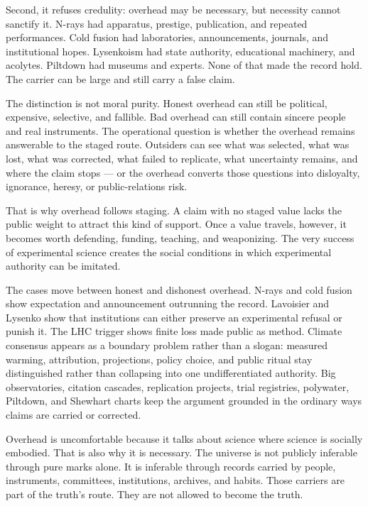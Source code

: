 \begin{chapteressay}
Second, it refuses credulity: overhead may be necessary, but necessity
cannot sanctify it. N-rays had apparatus, prestige, publication, and
repeated performances. Cold fusion had laboratories, announcements,
journals, and institutional hopes. Lysenkoism had state authority,
educational machinery, and acolytes. Piltdown had museums and experts. None
of that made the record hold. The carrier can be large and still carry a
false claim.

The distinction is not moral purity. Honest overhead can still be
political, expensive, selective, and fallible. Bad overhead can still
contain sincere people and real instruments. The operational question is
whether the overhead remains answerable to the staged route. Outsiders can
see what was selected, what was lost, what was corrected, what failed to
replicate, what uncertainty remains, and where the claim stops --- or the
overhead converts those questions into disloyalty, ignorance, heresy, or
public-relations risk.

That is why overhead follows staging. A claim with no staged value lacks
the public weight to attract this kind of support. Once a value travels,
however, it becomes worth defending, funding, teaching, and weaponizing.
The very success of experimental science creates the social conditions in
which experimental authority can be imitated.

The cases move between honest and dishonest overhead. N-rays and cold
fusion show expectation and announcement outrunning the record. Lavoisier
and Lysenko show that institutions can either preserve an experimental
refusal or punish it. The LHC trigger shows finite loss made public as
method. Climate consensus appears as a boundary problem rather than a
slogan: measured warming, attribution, projections, policy choice, and
public ritual stay distinguished rather than collapsing into one
undifferentiated authority. Big observatories, citation cascades,
replication projects, trial registries, polywater, Piltdown, and Shewhart
charts keep the argument grounded in the ordinary ways claims are carried
or corrected.

Overhead is uncomfortable because it talks about science where science is
socially embodied. That is also why it is necessary. The universe is not
publicly inferable through pure marks alone. It is inferable through
records carried by people, instruments, committees, institutions,
archives, and habits. Those carriers are part of the truth's route. They
are not allowed to become the truth.


\end{chapteressay}

